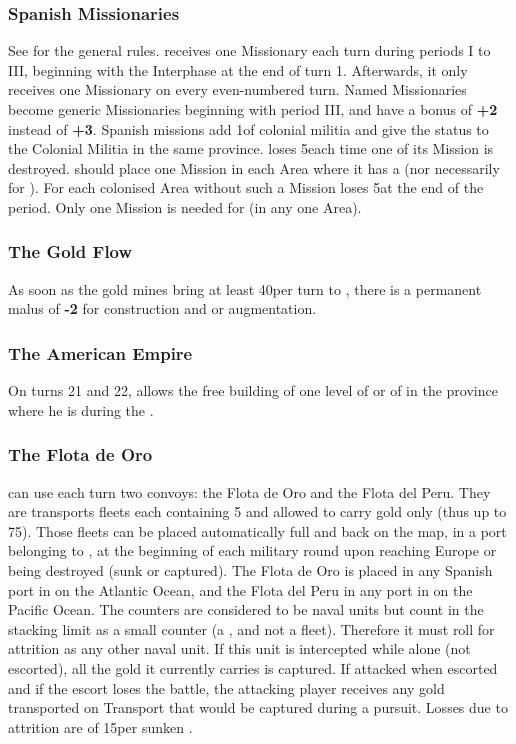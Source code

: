 \subsubsection{Spanish Missionaries}
\aparag See  for the general rules.
\aparag \SPA receives one Missionary each turn during periods I to III,
beginning with the Interphase at the end of turn 1. Afterwards, it only
receives one Missionary on every even-numbered turn.
\aparag Named Missionaries become generic Missionaries beginning with
period III, and have a bonus of {\bf +2} instead of {\bf +3}.
\aparag Spanish missions add 1\LDE of colonial militia and give the
 status to the Colonial Militia in the same province.
\aparag \SPA loses 5\PV each time one of its Mission is destroyed.
\aparag \SPA should place one Mission in each Area where it has a \COL
(nor necessarily for \TP). For each colonised Area without such a
Mission \SPA loses 5\PV at the end of the period.
\bparag Only one Mission is needed for 
(in any one Area).


\subsubsection{The Gold Flow}
\aparag As soon as the gold mines bring at least 40\ducats per turn to
\SPA, there is a permanent malus of {\bf -2} for \MNU construction and
\FTI or \DTI augmentation.


\subsubsection{The American Empire}
\aparag On turns 21 and 22,  allows the free building
of one level of  or of  in the \ROTW
province where he is during the .


\subsubsection{The Flota de Oro}
\aparag \SPA can use each turn two convoys: the Flota de Oro and the
Flota del Peru. They are transports fleets each containing 5 \NTD and
allowed to carry gold only (thus up to 75\ducats).
\bparag Those fleets can be placed automatically full and back on the
\ROTW map, in a \COL port belonging to \SPA, at the beginning of each
military round upon reaching Europe or being destroyed (sunk or
captured).
\bparag The Flota de Oro is placed in any Spanish port in
 on the Atlantic Ocean, and the Flota del Peru in any
port in  on the Pacific Ocean.
\aparag The counters are considered to be naval units but count in the
stacking limit as a small counter (a \DT, and not a fleet).
\bparag Therefore it must roll for attrition as any other naval unit. If
this unit is intercepted while alone (not escorted), all the gold it
currently carries is captured.
\bparag If attacked when escorted and if the escort loses the battle,
the attacking player receives any gold transported on Transport that
would be captured during a pursuit.
\bparag Losses due to attrition are of 15\ducats per sunken \NTD.


